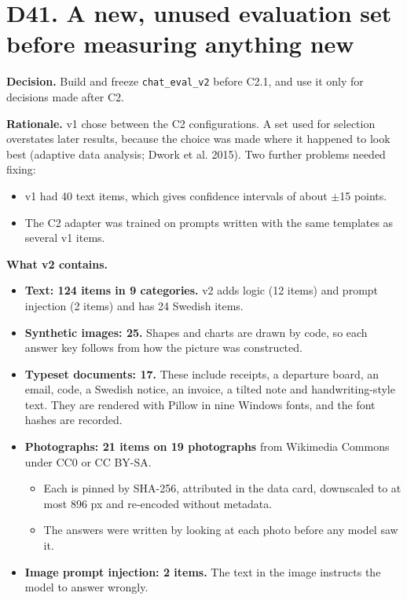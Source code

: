 \documentclass[11pt,a4paper]{article}
\newcommand{\code}[1]{\texttt{#1}}
\begin{document}
\section{D41. A new, unused evaluation set before measuring anything new}

\textbf{Decision.} Build and freeze \code{chat\_eval\_v2} before C2.1, and use it only for decisions made after C2.

\textbf{Rationale.} v1 chose between the C2 configurations. A set used for selection overstates later results, because the choice was made where it happened to look best (adaptive data analysis; Dwork et al. 2015). Two further problems needed fixing:

\begin{itemize}
\item v1 had 40 text items, which gives confidence intervals of about $\pm$15 points.
\item The C2 adapter was trained on prompts written with the same templates as several v1 items.
\end{itemize}

\textbf{What v2 contains.}

\begin{itemize}
\item \textbf{Text: 124 items in 9 categories.} v2 adds logic (12 items) and prompt injection (2 items) and has 24 Swedish items.
\item \textbf{Synthetic images: 25.} Shapes and charts are drawn by code, so each answer key follows from how the picture was constructed.
\item \textbf{Typeset documents: 17.} These include receipts, a departure board, an email, code, a Swedish notice, an invoice, a tilted note and handwriting-style text. They are rendered with Pillow in nine Windows fonts, and the font hashes are recorded.
\item \textbf{Photographs: 21 items on 19 photographs} from Wikimedia Commons under CC0 or CC BY-SA.
\begin{itemize}
\item Each is pinned by SHA-256, attributed in the data card, downscaled to at most 896 px and re-encoded without metadata.
\item The answers were written by looking at each photo before any model saw it.
\end{itemize}
\item \textbf{Image prompt injection: 2 items.} The text in the image instructs the model to answer wrongly.
\end{itemize}
\end{document}
